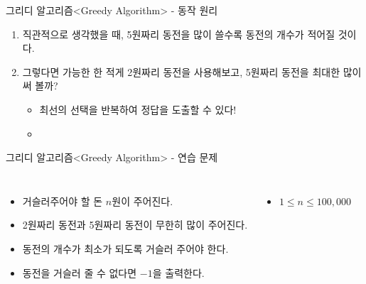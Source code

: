 \begin{frame}{그리디 알고리즘}{<Greedy Algorithm> - 동작 원리}
  \coinexample
  \vspace{2mm}
  \begin{enumerate}
    \item 직관적으로 생각했을 때, 5원짜리 동전을 많이 쓸수록 동전의 개수가 적어질 것이다.
    \item \alert{그렇다면 가능한 한 적게 2원짜리 동전을 사용해보고, 5원짜리 동전을 최대한 많이 써 볼까?}
    \begin{itemize}
      \item[$\to$] \alert{최선의 선택을 반복하여 정답을 도출할 수 있다!}
      \item[] 
    \end{itemize}
  \end{enumerate}
\end{frame}

\begin{frame}{그리디 알고리즘}{<Greedy Algorithm> - 연습 문제}
  \begin{center}
  \end{center}
  \vspace{4mm}
  \begin{columns}[T]
      \begin{itemize}
        \item 거슬러주어야 할 돈 \alert{$n$원}이 주어진다.
        \item \alert{2원짜리 동전과 5원짜리 동전}이 무한히 많이 주어진다.
        \item 동전의 개수가 \alert{최소}가 되도록 거슬러 주어야 한다.
        \item 동전을 거슬러 줄 수 없다면 $-1$을 출력한다.
      \end{itemize}
      \begin{itemize}
        \item $1 \le n \le 100{,}000$
      \end{itemize}
  \end{columns}
\end{frame}

